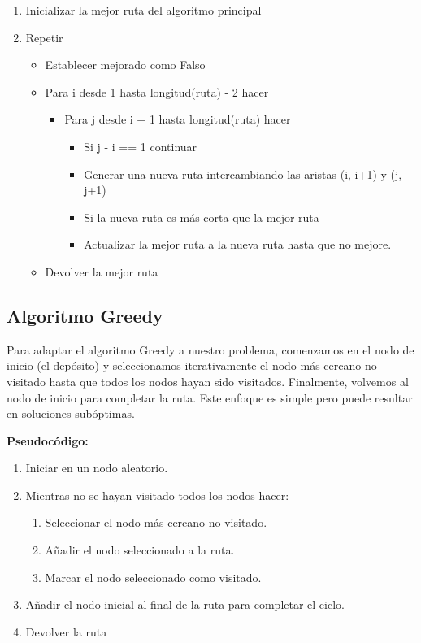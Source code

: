 \documentclass[11pt,a4paper,spanish]{book}
\begin{document}
\begin{tcolorbox}[colback=white!95!blue, colframe=blue!50!black, title=Algoritmo 2-opt, fontupper=\ttfamily]
	\begin{enumerate}
		\item Inicializar la mejor ruta del algoritmo principal
		\item Repetir
		\begin{itemize}
			\item Establecer mejorado como Falso
			\item Para i desde 1 hasta longitud(ruta) - 2 hacer
			\begin{itemize}
				\item Para j desde i + 1 hasta longitud(ruta) hacer
				\begin{itemize}
					\item Si j - i == 1 continuar
					\item Generar una nueva ruta intercambiando las aristas (i, i+1) y (j, j+1)
					\item Si la nueva ruta es más corta que la mejor ruta
						\item Actualizar la mejor ruta a la nueva ruta hasta que no mejore.
				\end{itemize}
			\end{itemize}    
			\item Devolver la mejor ruta
		\end{itemize}
	\end{enumerate}
\end{tcolorbox}


\subsection{Algoritmo Greedy}

Para adaptar el algoritmo Greedy a nuestro problema, comenzamos en el nodo de inicio (el depósito) y seleccionamos iterativamente el nodo más cercano no visitado hasta que todos los nodos hayan sido visitados. Finalmente, volvemos al nodo de inicio para completar la ruta. Este enfoque es simple pero puede resultar en soluciones subóptimas.

\textbf{Pseudocódigo:}
\begin{tcolorbox}[colback=white!95!blue, colframe=blue!50!black, title=Algoritmo Greedy, fontupper=\ttfamily]
\begin{enumerate}
    \item Iniciar en un nodo aleatorio.
    \item Mientras no se hayan visitado todos los nodos hacer:
    \begin{enumerate}
        \item Seleccionar el nodo más cercano no visitado.
        \item Añadir el nodo seleccionado a la ruta.
        \item Marcar el nodo seleccionado como visitado.
    \end{enumerate}
    \item Añadir el nodo inicial al final de la ruta para completar el ciclo.
    \item Devolver la ruta
\end{enumerate}
\end{tcolorbox}
\end{document}
